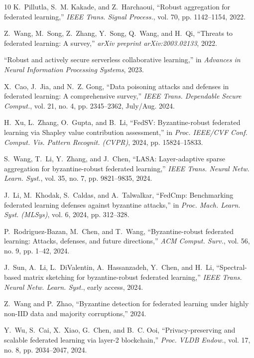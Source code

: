 \documentclass{ieeeaccess}
\begin{document}
\begin{thebibliography}{10}
K.~Pillutla, S.~M. Kakade, and Z.~Harchaoui,
``Robust aggregation for federated learning,''
\emph{IEEE Trans. Signal Process.}, vol. 70, pp. 1142--1154, 2022.

Z.~Wang, M.~Song, Z.~Zhang, Y.~Song, Q.~Wang, and H.~Qi,
``Threats to federated learning: A survey,''
\emph{arXiv preprint arXiv:2003.02133}, 2022.

``Robust and actively secure serverless collaborative learning,''
in \emph{Advances in Neural Information Processing Systems}, 2023.

X.~Cao, J.~Jia, and N.~Z. Gong,
``Data poisoning attacks and defenses in federated learning: A comprehensive survey,''
\emph{IEEE Trans. Dependable Secure Comput.}, vol. 21, no. 4, pp. 2345--2362, July/Aug. 2024.

H.~Xu, L.~Zhang, O.~Gupta, and B.~Li,
``FedSV: Byzantine-robust federated learning via Shapley value contribution assessment,''
in \emph{Proc. IEEE/CVF Conf. Comput. Vis. Pattern Recognit. (CVPR)}, 2024, pp. 15824--15833.

S.~Wang, T.~Li, Y.~Zhang, and J.~Chen,
``LASA: Layer-adaptive sparse aggregation for byzantine-robust federated learning,''
\emph{IEEE Trans. Neural Netw. Learn. Syst.}, vol. 35, no. 7, pp. 9821--9835, 2024.

J.~Li, M.~Khodak, S.~Caldas, and A.~Talwalkar,
``FedCmp: Benchmarking federated learning defenses against byzantine attacks,''
in \emph{Proc. Mach. Learn. Syst. (MLSys)}, vol. 6, 2024, pp. 312--328.

P.~Rodriguez-Bazan, M.~Chen, and T.~Wang,
``Byzantine-robust federated learning: Attacks, defenses, and future directions,''
\emph{ACM Comput. Surv.}, vol. 56, no. 9, pp. 1--42, 2024.

J.~Sun, A.~Li, L.~DiValentin, A.~Hassanzadeh, Y.~Chen, and H.~Li,
``Spectral-based matrix sketching for byzantine-robust federated learning,''
\emph{IEEE Trans. Neural Netw. Learn. Syst.}, early access, 2024.

Z.~Wang and P.~Zhao,
``Byzantine detection for federated learning under highly non-IID data and majority corruptions,'' 2024.

Y.~Wu, S.~Cai, X.~Xiao, G.~Chen, and B.~C. Ooi,
``Privacy-preserving and scalable federated learning via layer-2 blockchain,''
\emph{Proc. VLDB Endow.}, vol. 17, no. 8, pp. 2034--2047, 2024.


\end{thebibliography}
\end{document}
